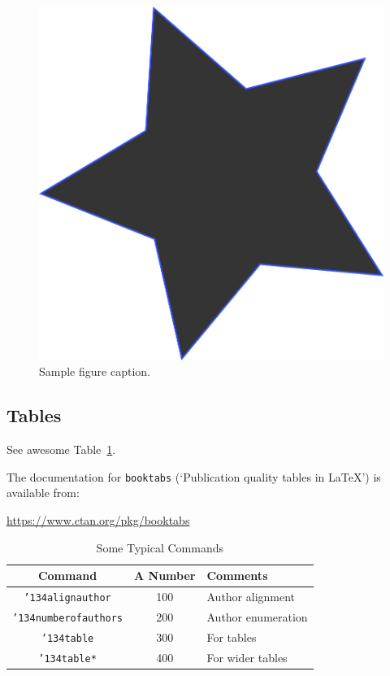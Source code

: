 \documentclass[article,slovene]{stucosrec}
\begin{document}
	\begin{figure}[H]
		\centering
		\includegraphics[scale=.5]{star.png}
		\caption{Sample figure caption.}
		\label{fig:fig3}
	\end{figure}
	
	\subsection{Tables}
	See awesome Table~\ref{tab:table}.
	
	The documentation for \verb+booktabs+ (`Publication quality tables in LaTeX') is available from:
	\begin{center}
		\url{https://www.ctan.org/pkg/booktabs}
	\end{center}	
	
	\begin{table}
		\centering
		\caption{Some Typical Commands}
		\label{tab:table}
		\begin{tabular}{|c|c|l|} \hline
			Command&A Number&Comments\\ \hline
			\texttt{{\char'134}alignauthor} & 100& Author alignment\\ \hline
			\texttt{{\char'134}numberofauthors}& 200& Author enumeration\\ \hline
			\texttt{{\char'134}table}& 300 & For tables\\ \hline
			\texttt{{\char'134}table*}& 400& For wider tables\\ \hline
		\end{tabular}
	\end{table}
	
\end{document}
